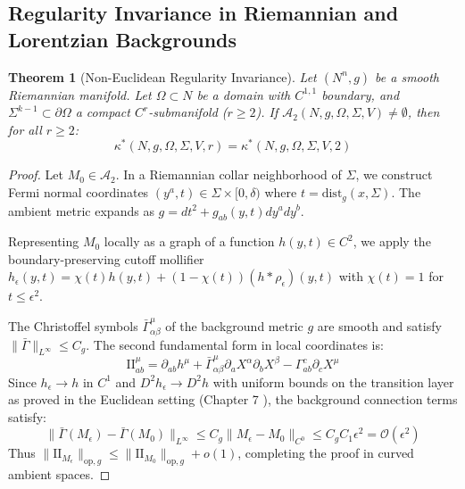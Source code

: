 \documentclass[11pt,reqno]{amsart}
\newtheorem{theorem}{Theorem}[section]
\theoremstyle{definition}
\providecommand{\II}{\mathrm{I\!I}}
\newcommand{\op}{\mathrm{op}}
\newcommand{\dist}{\mathrm{dist}}
\numberwithin{equation}{section}
\providecommand{\II}{\mathrm{II}}
\begin{document}
\subsection{Regularity Invariance in Riemannian and Lorentzian Backgrounds}

\begin{theorem}[Non-Euclidean Regularity Invariance]
\label{thm:noneuclidean_invariance}
Let $(N^n, g)$ be a smooth Riemannian manifold. Let $\Omega \subset N$ be a domain with $C^{1,1}$ boundary, and $\Sigma^{k-1} \subset \partial\Omega$ a compact $C^r$-submanifold ($r \ge 2$). If $\mathcal{A}_2(N, g, \Omega, \Sigma, V) \neq \emptyset$, then for all $r \ge 2$:
\begin{equation}
\kappa^*(N, g, \Omega, \Sigma, V, r) = \kappa^*(N, g, \Omega, \Sigma, V, 2)
\end{equation}
\end{theorem}

\begin{proof}
Let $M_0 \in \mathcal{A}_2$. In a Riemannian collar neighborhood of $\Sigma$, we construct Fermi normal coordinates $(y^a, t) \in \Sigma \times [0, \delta)$ where $t = \dist_g(x, \Sigma)$. The ambient metric expands as $g = dt^2 + g_{ab}(y, t) dy^a dy^b$. 

Representing $M_0$ locally as a graph of a function $h(y, t) \in C^2$, we apply the boundary-preserving cutoff mollifier $h_\epsilon(y, t) = \chi(t) h(y, t) + (1-\chi(t))(h * \rho_\epsilon)(y, t)$ with $\chi(t) = 1$ for $t \le \epsilon^2$. 

The Christoffel symbols $\bar{\Gamma}^\mu_{\alpha\beta}$ of the background metric $g$ are smooth and satisfy $\|\bar{\Gamma}\|_{L^\infty} \le C_g$. The second fundamental form in local coordinates is:
\begin{equation}
\II^\mu_{ab} = \partial_{ab} h^\mu + \bar{\Gamma}^\mu_{\alpha\beta} \partial_a X^\alpha \partial_b X^\beta - \Gamma^c_{ab} \partial_c X^\mu
\end{equation}
Since $h_\epsilon \to h$ in $C^1$ and $D^2 h_\epsilon \to D^2 h$ with uniform bounds on the transition layer as proved in the Euclidean setting (Chapter 7 \cite{silvafilho2026minimax}), the background connection terms satisfy:
\begin{equation}
\|\bar{\Gamma}(M_\epsilon) - \bar{\Gamma}(M_0)\|_{L^\infty} \le C_g \|M_\epsilon - M_0\|_{C^0} \le C_g C_1 \epsilon^2 = \mathcal{O}(\epsilon^2)
\end{equation}
Thus $\|\II_{M_\epsilon}\|_{\op, g} \le \|\II_{M_0}\|_{\op, g} + o(1)$, completing the proof in curved ambient spaces.
\end{proof}
\end{document}
